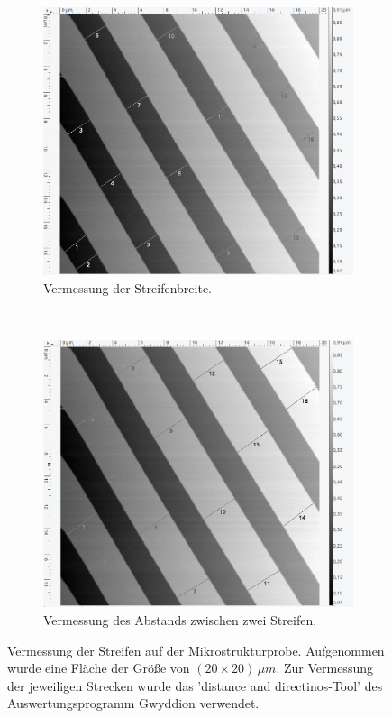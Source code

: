 \begin{figure}[H]
\centering
	\begin{subfigure}[t]{0.45\textwidth}
	\includegraphics[width=\textwidth]{AFM_auswertung/streif_durch_vor.png}
	\caption{Vermessung der Streifenbreite.}
	\label{abb:streifa}
	\end{subfigure}
	~
	\begin{subfigure}[t]{0.45\textwidth}
	\includegraphics[width=\textwidth]{AFM_auswertung/streif_abb_vor.png}
	\caption{Vermessung des Abstands zwischen zwei Streifen.}
	\label{abb:streifb}
	\end{subfigure}
\caption{Vermessung der Streifen auf der Mikrostrukturprobe. Aufgenommen wurde eine Fl\"ache der Gr\"o{\ss}e von $(20 \times 20) \, \mu m$. Zur Vermessung der jeweiligen Strecken wurde das 'distance and directinos-Tool' des Auswertungsprogramm Gwyddion verwendet.}
\label{abb:streif}
\end{figure}


